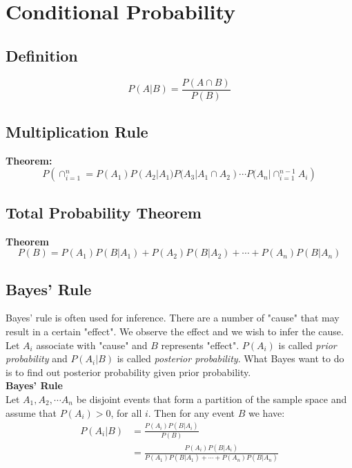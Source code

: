 \documentclass[11pt]{article}
\begin{document}
\section{Conditional Probability}
\subsection{Definition}
$$P(A|B) = \frac{P(A \cap B)}{P(B)}$$

\subsection{Multiplication Rule}
\textbf{Theorem:}\\
$$P\left(\cap ^{n}_{i=1} = P(A_1)P(A_2|A_1)P(A_3|A_1 \cap A_2) \cdots P(A_n|\cap ^{n-1}_{i=1}A_i\right)$$

\subsection{Total Probability Theorem}
\textbf{Theorem}\\
$$P(B) = P(A_1)P(B|A_1)+P(A_2)P(B|A_2)+\cdots +P(A_n)P(B|A_n)$$

\subsection{Bayes' Rule}
Bayes' rule is often used for inference. There are a number of "cause" that may result in a certain "effect". We observe the effect and we wish to infer the cause. Let $A_i$ associate with "cause" and $B$ represents "effect". $P(A_i)$ is called \emph{prior probability} and $P(A_i | B)$ is called \emph{posterior probability}. What Bayes want to do is to find out posterior probability given prior probability.\\

\noindent \textbf{Bayes' Rule}\\
Let $A_1 , A_2 , \cdots A_n$ be disjoint events that form a partition of the sample space and assume that $P(A_i) > 0$, for all $i$. Then for any event $B$ we have:\\
\begin{equation*}
    \begin{split}
        P(A_i | B) & = \frac{P(A_i)P(B|A_i)}{P(B)}\\
                   & = \frac{P(A_i)P(B|A_i)}{P(A_1)P(B|A_1)+\cdots +P(A_n)P(B|A_n)}
    \end{split}
\end{equation*}
\end{document}
